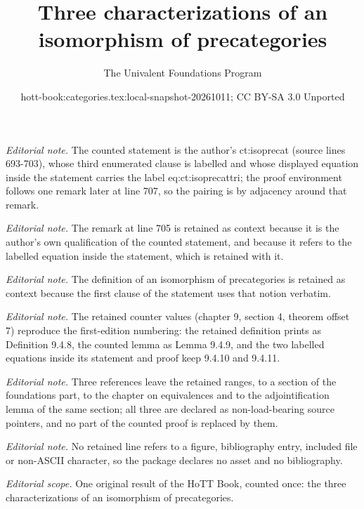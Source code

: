 \documentclass[10pt,a4paper]{article}
\title{Three characterizations of an isomorphism of precategories}
\author{The Univalent Foundations Program}
\date{hott-book:categories.tex:local-snapshot-20261011; CC BY-SA 3.0 Unported}
\newcounter{chapter}
\theoremstyle{definition}
\theoremstyle{remark}
\numberwithin{equation}{section}
\begin{document}
\maketitle
\setcounter{chapter}{9}
\setcounter{section}{4}
\setcounter{thm}{7}
\noindent\textit{Editorial note.} The counted statement is the author's ct:isoprecat (source lines 693-703), whose third enumerated clause is labelled and whose displayed equation inside the statement carries the label eq:ct:isoprecattri; the proof environment follows one remark later at line 707, so the pairing is by adjacency around that remark.\par\medskip
\noindent\textit{Editorial note.} The remark at line 705 is retained as context because it is the author's own qualification of the counted statement, and because it refers to the labelled equation inside the statement, which is retained with it.\par\medskip
\noindent\textit{Editorial note.} The definition of an isomorphism of precategories is retained as context because the first clause of the statement uses that notion verbatim.\par\medskip
\noindent\textit{Editorial note.} The retained counter values (chapter 9, section 4, theorem offset 7) reproduce the first-edition numbering: the retained definition prints as Definition 9.4.8, the counted lemma as Lemma 9.4.9, and the two labelled equations inside its statement and proof keep 9.4.10 and 9.4.11.\par\medskip
\noindent\textit{Editorial note.} Three references leave the retained ranges, to a section of the foundations part, to the chapter on equivalences and to the adjointification lemma of the same section; all three are declared as non-load-bearing source pointers, and no part of the counted proof is replaced by them.\par\medskip
\noindent\textit{Editorial note.} No retained line refers to a figure, bibliography entry, included file or non-ASCII character, so the package declares no asset and no bibliography.\par\medskip
\noindent\textit{Editorial scope.} One original result of the HoTT Book, counted once: the three characterizations of an isomorphism of precategories.\par\medskip
\end{document}
